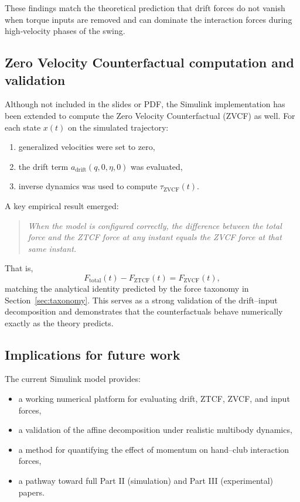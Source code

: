 \documentclass[12pt]{article}
\begin{document}
These findings match the theoretical prediction that drift forces do not vanish when torque inputs are removed and can dominate the interaction forces during high‐velocity phases of the swing.

\subsection{Zero Velocity Counterfactual computation and validation}

Although not included in the slides or PDF, the Simulink implementation has been extended to compute the Zero Velocity Counterfactual (ZVCF) as well. For each state \(x(t)\) on the simulated trajectory:
\begin{enumerate}
  \item generalized velocities were set to zero,
  \item the drift term \(a_{\mathrm{drift}}(q,0,\eta,0)\) was evaluated,
  \item inverse dynamics was used to compute \(\tau_{\mathrm{ZVCF}}(t)\).
\end{enumerate}

A key empirical result emerged:  
\begin{quote}
\textit{When the model is configured correctly, the difference between the total force and the ZTCF force at any instant equals the ZVCF force at that same instant.}
\end{quote}

That is,
\[
  F_{\text{total}}(t) - F_{\mathrm{ZTCF}}(t) = F_{\mathrm{ZVCF}}(t),
\]
matching the analytical identity predicted by the force taxonomy in Section~\ref{sec:taxonomy}. This serves as a strong validation of the drift–input decomposition and demonstrates that the counterfactuals behave numerically exactly as the theory predicts.

\subsection{Implications for future work}

The current Simulink model provides:
\begin{itemize}
  \item a working numerical platform for evaluating drift, ZTCF, ZVCF, and input forces,
  \item a validation of the affine decomposition under realistic multibody dynamics,
  \item a method for quantifying the effect of momentum on hand–club interaction forces,
  \item a pathway toward full Part II (simulation) and Part III (experimental) papers.
\end{itemize}
\end{document}
